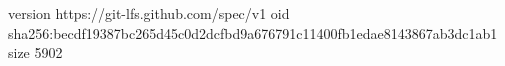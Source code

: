 version https://git-lfs.github.com/spec/v1
oid sha256:becdf19387bc265d45c0d2dcfbd9a676791c11400fb1edae8143867ab3dc1ab1
size 5902

